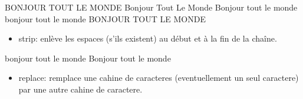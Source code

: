 \documentclass[letterpaper,10pt,french]{sphinxmanual}
\begin{document}
\begin{sphinxVerbatim}[commandchars=\\\{\}]
  
  
  

\end{sphinxVerbatim}

\begin{sphinxVerbatim}[commandchars=\\\{\}]
BONJOUR TOUT LE MONDE
Bonjour Tout Le Monde
Bonjour tout le monde
bonjour tout le monde
BONJOUR TOUT LE MONDE
\end{sphinxVerbatim}
\begin{itemize}
\item {} 
\sphinxAtStartPar
strip: enlève les espaces (s’ils existent) au début et à la fin de la chaîne.

\end{itemize}

\begin{sphinxVerbatim}[commandchars=\\\{\}]
  
  

\end{sphinxVerbatim}

\begin{sphinxVerbatim}[commandchars=\\\{\}]
bonjour tout le monde
Bonjour tout le monde
\end{sphinxVerbatim}
\begin{itemize}
\item {} 
\sphinxAtStartPar
replace: remplace une cahine de caracteres (eventuellement un seul caractere) par une autre cahine de caractere.

\end{itemize}
\end{document}
